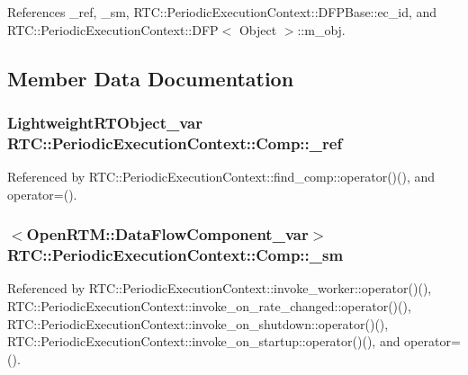 References \_\-ref, \_\-sm, RTC::PeriodicExecutionContext::DFPBase::ec\_\-id, and RTC::PeriodicExecutionContext::DFP$<$ Object $>$::m\_\-obj.



\subsection{Member Data Documentation}
\subsubsection[{\_\-ref}]{\setlength{\rightskip}{0pt plus 5cm}LightweightRTObject\_\-var {\bf RTC::PeriodicExecutionContext::Comp::\_\-ref}}\label{structRTC_1_1PeriodicExecutionContext_1_1Comp_a89c18f8979cf0aebe1d86aa3f325e87d}


Referenced by RTC::PeriodicExecutionContext::find\_\-comp::operator()(), and operator=().

\subsubsection[{\_\-sm}]{$<$OpenRTM::DataFlowComponent\_\-var$>$ {\bf RTC::PeriodicExecutionContext::Comp::\_\-sm}}\label{structRTC_1_1PeriodicExecutionContext_1_1Comp_af6e5c9ecbc12788026b4211c6952bf6d}


Referenced by RTC::PeriodicExecutionContext::invoke\_\-worker::operator()(), RTC::PeriodicExecutionContext::invoke\_\-on\_\-rate\_\-changed::operator()(), RTC::PeriodicExecutionContext::invoke\_\-on\_\-shutdown::operator()(), RTC::PeriodicExecutionContext::invoke\_\-on\_\-startup::operator()(), and operator=().

